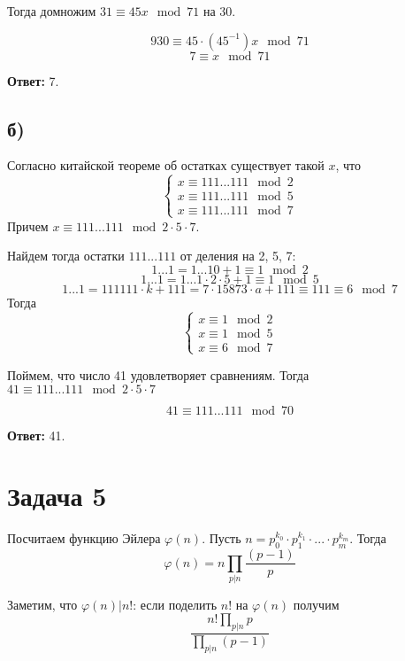 \documentclass{article}
\begin{document}
		Тогда домножим $31 \equiv 45x \mod 71$ на $30$.
			
			$$930 \equiv 45 \cdot (45^{-1})x \mod 71$$
			$$7 \equiv x \mod 71$$
			
		\textbf{Ответ:} 7.
		
		\subsection {б)} Согласно китайской теореме об остатках существует такой $x$, что 
			\begin{equation*} 
				\begin{cases}
					x \equiv 111...111 \mod 2 \\
					x \equiv 111...111 \mod 5 \\
					x \equiv 111...111 \mod 7
				\end{cases}
			\end{equation*}
		Причем  $x \equiv 111...111 \mod 2 \cdot 5 \cdot 7 $.
		
		Найдем тогда остатки $111...111$ от деления на 2, 5, 7:
			$$1...1 = 1...10 + 1 \equiv 1 \mod 2$$
			$$1...1 = 1...1 \cdot 2 \cdot 5 + 1 \equiv 1\mod 5$$
			$$1...1 = 111111 \cdot k + 111  = 7 \cdot 15873  \cdot a + 111 \equiv 111 \equiv 6\mod 7$$
	    Тогда 
	    \begin{equation*} 
		    \begin{cases}
			    x \equiv 1 \mod 2 \\
			    x \equiv 1 \mod 5 \\
			    x \equiv 6 \mod 7
		    \end{cases}
	    \end{equation*}
		
		Поймем, что число 41 удовлетворяет сравнениям. Тогда $41 \equiv 111...111 \mod 2 \cdot 5 \cdot 7 $
		
		$$ 41 \equiv 111...111 \mod 70 $$
		
		\textbf{Ответ:} 41.
		
		\section{Задача 5}
		  
		  Посчитаем функцию Эйлера $\varphi(n)$. Пусть $n = p_0^{k_0} \cdot p_1^{k_1} \cdot ... \cdot p_m^{k_m}$. Тогда $$\varphi(n) = n \prod_{p|n}\frac{(p - 1)}{p}$$
		  
		  Заметим, что $\varphi(n) | n!$: если поделить $n!$ на $\varphi(n)$ получим  
		  $$\frac {n! \prod_{p|n}p} {\prod_{p|n} (p - 1)}$$
		  
\end{document}
